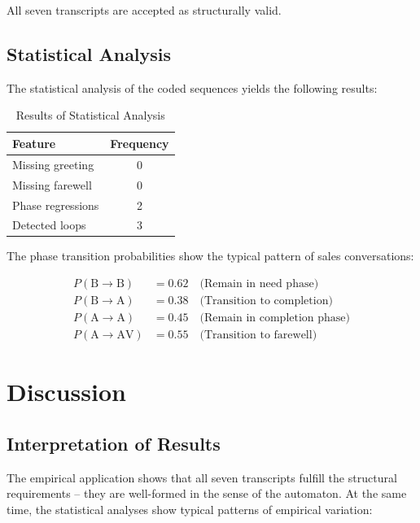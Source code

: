 \documentclass[
  12pt,
  a4paper,
  oneside,
  titlepage
]{article}
\begin{document}
All seven transcripts are accepted as structurally valid.

\subsection{Statistical Analysis}

The statistical analysis of the coded sequences yields the following results:

\begin{table}[h]
\centering
\caption{Results of Statistical Analysis}
\label{tab:statistics}
\begin{tabular}{@{} l c @{}}
\toprule
\textbf{Feature} & \textbf{Frequency} \\
\midrule
Missing greeting & 0 \\
Missing farewell & 0 \\
Phase regressions & 2 \\
Detected loops & 3 \\
\bottomrule
\end{tabular}
\end{table}

The phase transition probabilities show the typical pattern of sales 
conversations:

\begin{align*}
P(\text{B} \to \text{B}) &= 0.62 \quad \text{(Remain in need phase)} \\
P(\text{B} \to \text{A}) &= 0.38 \quad \text{(Transition to completion)} \\
P(\text{A} \to \text{A}) &= 0.45 \quad \text{(Remain in completion phase)} \\
P(\text{A} \to \text{AV}) &= 0.55 \quad \text{(Transition to farewell)}
\end{align*}

\section{Discussion}

\subsection{Interpretation of Results}

The empirical application shows that all seven transcripts fulfill the structural 
requirements – they are well-formed in the sense of the automaton. At the same 
time, the statistical analyses show typical patterns of empirical variation:
\end{document}
